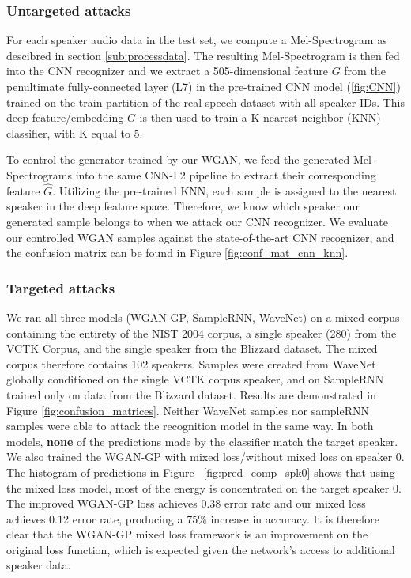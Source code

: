 \subsubsection{Untargeted attacks}
\label{sub:untargeted}
For each speaker audio data in the test set, we compute a Mel-Spectrogram as
descibred in section \ref{sub:processdata}. The resulting Mel-Spectrogram is
then fed into the CNN recognizer and we extract a 505-dimensional feature $G$ from
the penultimate fully-connected layer (L7) in the pre-trained CNN model
(\ref{fig:CNN}) trained on the train partition of the real speech dataset with all 
speaker IDs.  This deep feature/embedding $G$ is then used to train a 
K-nearest-neighbor (KNN) classifier, with K equal to 5.

To control the generator trained by our WGAN, we feed the generated
Mel-Spectrograms into the same CNN-L2 pipeline to extract their corresponding
feature $\widehat G$. Utilizing the pre-trained KNN, each sample is assigned to
the nearest speaker in the deep feature space. Therefore, we know which speaker
our generated sample belongs to when we attack our CNN recognizer. We evaluate our
controlled WGAN samples against the state-of-the-art CNN recognizer, and the
confusion matrix can be found in Figure \ref{fig:conf_mat_cnn_knn}. 


\subsubsection{Targeted attacks}
\label{sub:targeted}
We ran all three models (WGAN-GP, SampleRNN, WaveNet) on a mixed corpus containing the entirety of the NIST 2004 corpus, a single speaker (280) from the VCTK Corpus, and the single speaker from the Blizzard dataset. The mixed corpus therefore contains 102 speakers. Samples were created from WaveNet globally conditioned on the single VCTK corpus speaker, and on SampleRNN trained only on data from the Blizzard dataset.
Results are demonstrated in Figure
\ref{fig:confusion_matrices}. Neither WaveNet samples nor sampleRNN samples
were able to attack the recognition model in the same way. In both models, \textbf{none} of the predictions made by the classifier match the target speaker. \\ We also trained the WGAN-GP with mixed loss/without mixed loss on speaker 0. The histogram of predictions in Figure
~\ref{fig:pred_comp_spk0} shows that using the mixed loss model, most of the energy is concentrated on the target speaker 0. The improved WGAN-GP loss achieves 0.38 error
rate and our mixed loss achieves 0.12 error rate, producing a 75\%
increase in accuracy. It is therefore clear that the WGAN-GP mixed loss framework is an improvement on the original loss function, which is expected given the network's access to additional speaker data.

